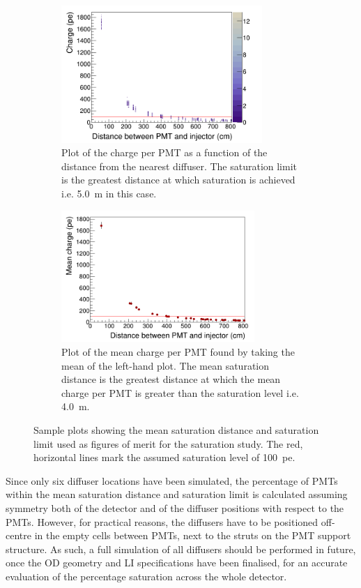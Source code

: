 \documentclass[a4paper,11pt]{article}
\begin{document}
\begin{figure}[ht!]
    \centering
    \begin{subfigure}{0.49\textwidth}
         \centering
         \includegraphics[width=\linewidth, height=5.2cm]{charge_distance_reduced_diffuser_41_365.0_nm_10.0_ns_5500000_ppp_all.png}
         \caption{Plot of the charge per PMT as a function of the distance from the nearest diffuser. The saturation limit is the greatest distance at which saturation is achieved i.e. 5.0~m in this case.}
         \label{fig:maxSatDistPlot}
     \end{subfigure}
     \hfill
     \begin{subfigure}{0.49\textwidth}
         \centering
         \includegraphics[width=\linewidth,height=5cm]{mean_charge_distance_reduced_diffuser_41_365.0_nm_10.0_ns_5500000_ppp_all.png}
         \caption{Plot of the mean charge per PMT found by taking the mean of the left-hand plot. The mean saturation distance is the greatest distance at which the mean charge per PMT is greater than the saturation level i.e. 4.0~m.}
         \label{fig:meanSatDistPlot}
     \end{subfigure}
     \caption{Sample plots showing the mean saturation distance and saturation limit used as figures of merit for the saturation study. The red, horizontal lines mark the assumed saturation level of 100~pe.}
     \label{fig:satAnalysisPlots}
\end{figure}

Since only six diffuser locations have been simulated, the percentage of PMTs within the mean saturation distance and saturation limit is calculated assuming symmetry both of the detector and of the diffuser positions with respect to the PMTs. However, for practical reasons, the diffusers have to be positioned off-centre in the empty cells between PMTs, next to the struts on the PMT support structure. As such, a full simulation of all diffusers should be performed in future, once the OD geometry and LI specifications have been finalised, for an accurate evaluation of the percentage saturation across the whole detector.
\end{document}
